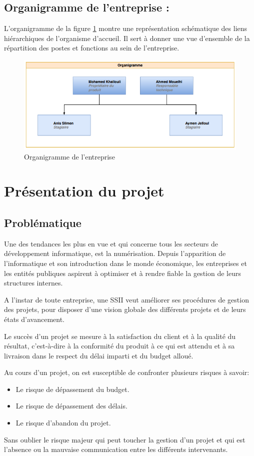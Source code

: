\subsection{	Organigramme de l’entreprise  :}
\hspace{4mm}L’organigramme de la figure \ref{fig:bureau} montre une représentation schématique des liens hiérarchiques de l'organisme d'accueil. Il sert à donner une vue d’ensemble de la répartition des postes et fonctions au sein de l'entreprise. 
\begin{figure}[h]
		\centering
		\includegraphics[scale=0.7]{figures/a10.png}
		\caption{Organigramme de l'entreprise}
		\label{fig:bureau}
\end{figure}

 \section{	Présentation du projet  }
 \subsection{	Problématique}
\hspace{4mm} Une des tendances les plus en vue et qui concerne tous les secteurs de développement informatique, est la numérisation. Depuis l’apparition de l’informatique et son introduction dans le monde économique, les entreprises et les entités publiques aspirent à optimiser et à rendre fiable la gestion de leurs structures internes.
\par A l’instar de toute entreprise, une SSII veut améliorer ses procédures de gestion des projets, pour disposer d’une vision globale des différents projets et de leurs états d’avancement.
\par Le succès d’un projet se mesure à la satisfaction du client et à la qualité du résultat, c’est-à-dire à la conformité du produit à ce qui est attendu et à sa livraison dans le respect du délai imparti et du budget alloué.
\par Au cours d’un projet, on est susceptible de confronter plusieurs risques à savoir:
\begin{itemize}
    \item Le risque de dépassement du budget.
    \item Le risque de dépassement des délais.
    \item Le risque d’abandon du projet.
\end{itemize}
\par Sans oublier le risque majeur qui peut toucher la gestion d'un projet et qui est l'absence ou la mauvaise communication entre les différents intervenants. 

